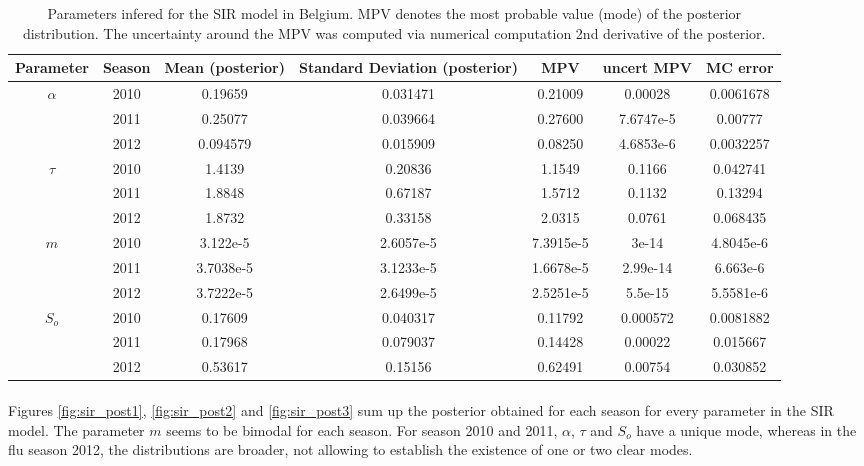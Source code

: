 \documentclass[11pt, a4paper]{article}
\begin{document}
\begin{table}
\centering
\begin{tabular}{| c | c | c | c | c | c | c |}
    \hline
    Parameter & Season & Mean (posterior) &  Standard Deviation (posterior) & MPV & uncert MPV & MC error\\ \hline
    \multirow{3}{*}{$\alpha$} & 2010 & 0.19659 & 0.031471 &0.21009 & 0.00028& 0.0061678 \\
    & 2011 & 0.25077 & 0.039664 & 0.27600 & 7.6747e-5 & 0.00777 \\
    & 2012 & 0.094579 & 0.015909 & 0.08250 & 4.6853e-6 & 0.0032257 \\ \hline
    \multirow{3}{*}{$\tau$} & 2010 & 1.4139 & 0.20836 & 1.1549 & 0.1166 & 0.042741 \\ 
    & 2011 & 1.8848 & 0.67187 & 1.5712 & 0.1132 & 0.13294 \\ 
    & 2012 & 1.8732 & 0.33158 & 2.0315 & 0.0761 & 0.068435 \\ \hline
    \multirow{3}{*}{$m$} & 2010 & 3.122e-5 & 2.6057e-5 &7.3915e-5 & 3e-14 & 4.8045e-6 \\ 
    & 2011 & 3.7038e-5 & 3.1233e-5 &1.6678e-5 & 2.99e-14 & 6.663e-6 \\ 
    & 2012 & 3.7222e-5 & 2.6499e-5 & 2.5251e-5 & 5.5e-15 & 5.5581e-6 \\ \hline
    \multirow{3}{*}{$S_o$} & 2010 & 0.17609 & 0.040317 &0.11792 & 0.000572 & 0.0081882 \\
    & 2011 & 0.17968 & 0.079037 & 0.14428 & 0.00022 & 0.015667 \\ 
    & 2012 & 0.53617 & 0.15156 & 0.62491 & 0.00754 & 0.030852 \\ \hline
    \end{tabular}
    \caption{Parameters infered for the SIR model in Belgium. MPV denotes the most probable value (mode) of the posterior distribution. The uncertainty around the MPV was computed via numerical computation 2nd derivative of the posterior.}
    \label{tab:sirDRAM}
\end{table}

\paragraph{}
Figures \ref{fig:sir_post1}, \ref{fig:sir_post2} and \ref{fig:sir_post3} sum up the posterior obtained for each season for every parameter in the SIR model. The parameter $m$ seems to be bimodal for each season. For season 2010 and 2011, $\alpha$, $\tau$ and $S_o$ have a unique mode, whereas in the flu season 2012, the distributions are broader, not allowing to establish the existence of one or two clear modes.
\end{document}
